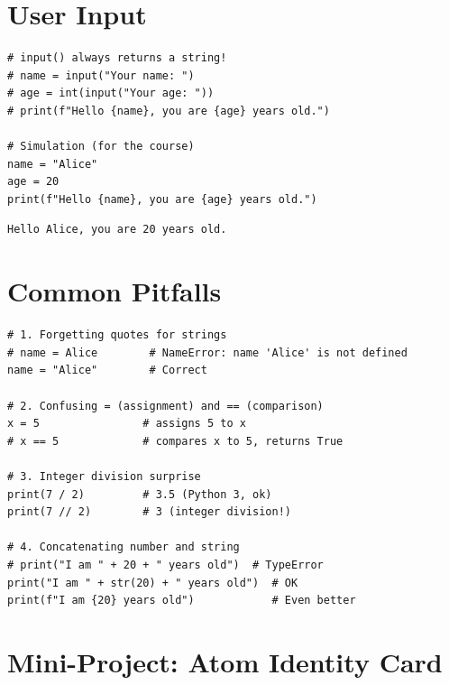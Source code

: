 \section{User Input}

\begin{codeblock}[title=\textbf{Python --- input}]
\begin{verbatim}
# input() always returns a string!
# name = input("Your name: ")
# age = int(input("Your age: "))
# print(f"Hello {name}, you are {age} years old.")

# Simulation (for the course)
name = "Alice"
age = 20
print(f"Hello {name}, you are {age} years old.")
\end{verbatim}
\end{codeblock}

\begin{codeoutput}
\begin{verbatim}
Hello Alice, you are 20 years old.
\end{verbatim}
\end{codeoutput}

\section{Common Pitfalls}

\begin{errmark}
\begin{codeblock}[title=\textbf{Common errors}]
\begin{verbatim}
# 1. Forgetting quotes for strings
# name = Alice        # NameError: name 'Alice' is not defined
name = "Alice"        # Correct

# 2. Confusing = (assignment) and == (comparison)
x = 5                # assigns 5 to x
# x == 5             # compares x to 5, returns True

# 3. Integer division surprise
print(7 / 2)         # 3.5 (Python 3, ok)
print(7 // 2)        # 3 (integer division!)

# 4. Concatenating number and string
# print("I am " + 20 + " years old")  # TypeError
print("I am " + str(20) + " years old")  # OK
print(f"I am {20} years old")            # Even better
\end{verbatim}
\end{codeblock}
\end{errmark}

\section{Mini-Project: Atom Identity Card}

